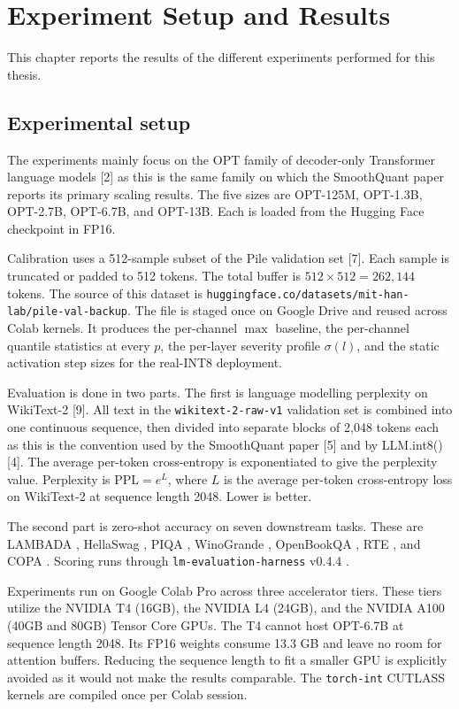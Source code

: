 \chapter{Experiment Setup and Results}

This chapter reports the results of the different experiments performed for this thesis.

\section{Experimental setup}

The experiments mainly focus on the OPT family of decoder-only Transformer language models [2] as this is the same family on which the SmoothQuant paper reports its primary scaling results. The five sizes are OPT-125M, OPT-1.3B, OPT-2.7B, OPT-6.7B, and OPT-13B. Each is loaded from the Hugging Face checkpoint in FP16.

Calibration uses a 512-sample subset of the Pile validation set [7]. Each sample is truncated or padded to 512 tokens. The total buffer is $512 \times 512 = 262{,}144$ tokens. The source of this dataset is \texttt{huggingface.co/datasets/mit-han-lab/pile-val-backup}. The file is staged once on Google Drive and reused across Colab kernels. It produces the per-channel $\max$ baseline, the per-channel quantile statistics at every $p$, the per-layer severity profile $\sigma(l)$, and the static activation step sizes for the real-INT8 deployment.

Evaluation is done in two parts. The first is language modelling perplexity on WikiText-2 [9]. All text in the \texttt{wikitext-2-raw-v1} validation set is combined into one continuous sequence, then divided into separate blocks of 2,048 tokens each as this is the convention used by the SmoothQuant paper [5] and by LLM.int8() [4]. The average per-token cross-entropy is exponentiated to give the perplexity value. Perplexity is $\mathrm{PPL} = e^{L}$, where $L$ is the average per-token cross-entropy loss on WikiText-2 at sequence length 2048. Lower is better.

The second part is zero-shot accuracy on seven downstream tasks. These are LAMBADA \cite{lambada_dataset}, HellaSwag \cite{hellaswag_dataset}, PIQA \cite{piqa_dataset}, WinoGrande \cite{winogrande_dataset}, OpenBookQA \cite{openbookqa_dataset}, RTE \cite{rte_dataset}, and COPA \cite{copa_dataset}. Scoring runs through \texttt{lm-evaluation-harness} v0.4.4 \cite{lm_eval_harness}.

Experiments run on Google Colab Pro across three accelerator tiers. These tiers utilize the NVIDIA T4 (16GB), the NVIDIA L4 (24GB), and the NVIDIA A100 (40GB and 80GB) Tensor Core GPUs. The T4 cannot host OPT-6.7B at sequence length 2048. Its FP16 weights consume 13.3 GB and leave no room for attention buffers. Reducing the sequence length to fit a smaller GPU is explicitly avoided as it would not make the results comparable. The \texttt{torch-int} CUTLASS kernels are compiled once per Colab session.


